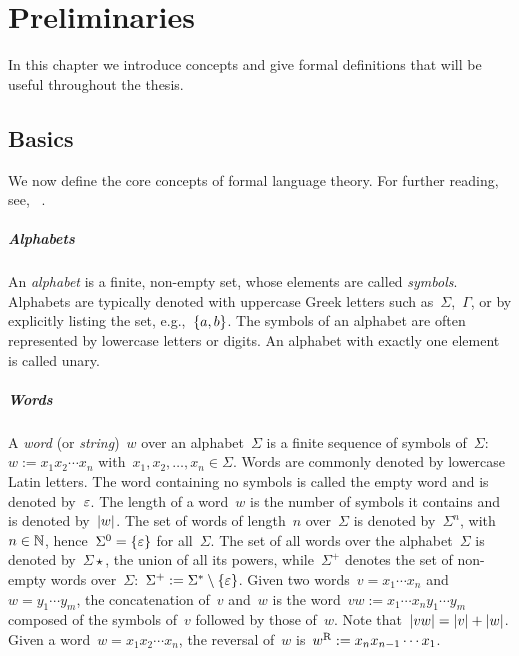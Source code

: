 \chapter{Preliminaries}\label{ch:preliminaries}
In this chapter we introduce concepts and give formal definitions that will be useful throughout the thesis.



\section{Basics}
We now define the core concepts of formal language theory.
For further reading, see, \eg[,]~\cite{HopUll79,Sha08}.

\paragraph{Alphabets} An \emph{alphabet} is a finite, non-empty set, whose elements are called \emph{symbols}.
Alphabets are typically denoted with uppercase Greek letters such as~$\Sigma$,~$\Gamma$, or by explicitly listing the set, e.g.,~$\{a,b\}$.
The symbols of an alphabet are often represented by lowercase letters or digits.
An alphabet with exactly one element is called unary.

\paragraph{Words} A \emph{word} (or \emph{string})~$w$ over an alphabet~$\Sigma$ is a finite sequence of symbols of~$\Sigma$:~$w:=x_1 x_2 \cdots x_n$ with~$x_1,x_2,\dots,x_n\in\Sigma$.
Words are commonly denoted by lowercase Latin letters.
The word containing no symbols is called the empty word and is denoted by~$\varepsilon$.
The length of a word~$w$ is the number of symbols it contains and is denoted by~$\lvert w \rvert$.
The set of words of length~$n$ over~$\Sigma$ is denoted by~$\Sigma^n$, with~$n\in\mathbb N$, hence~$\Sigma^0=\{\varepsilon\}$ for all~$\Sigma$.
The set of all words over the alphabet~$\Sigma$ is denoted by~$\Sigma\star$, \ie the union of all its powers, while~$\Sigma^+$ denotes the set of non-empty words over~$\Sigma$:~$\Sigma^+ := \Sigma^*\setminus\{\varepsilon\}$.
Given two words~$v=x_1\cdots x_n$ and~$w=y_1\cdots y_m$, the concatenation of~$v$ and~$w$ is the word~$vw:=x_1\cdots x_n y_1\cdots y_m$ composed of the symbols of~$v$ followed by those of~$w$.
Note that~$\lvert vw \rvert=\lvert v \rvert+\lvert w \rvert$.
Given a word~$w=x_1 x_2\cdots x_n$, the reversal of~$w$ is~$w^{\mathrm R}:=x_n x_{n-1}\cdots x_1$.


